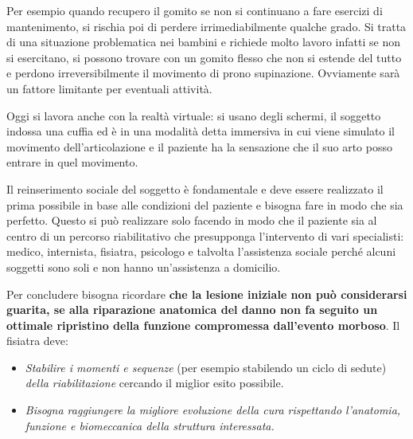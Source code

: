 Per esempio quando recupero il gomito se non si continuano a fare esercizi di mantenimento, si rischia poi di perdere irrimediabilmente qualche grado. Si tratta di una situazione problematica nei bambini e richiede molto lavoro infatti se non si esercitano, si possono trovare
con un gomito flesso che non si estende del tutto e perdono irreversibilmente il movimento di prono supinazione. Ovviamente sarà un fattore limitante per eventuali attività.

Oggi si lavora anche con la realtà virtuale: si usano degli schermi, il soggetto indossa una cuffia ed è in una modalità detta immersiva in cui viene simulato il movimento dell'articolazione e il paziente ha la sensazione che il suo arto posso entrare in quel movimento.

Il reinserimento sociale del soggetto è fondamentale e deve essere realizzato il prima possibile in base alle condizioni del paziente e bisogna fare in modo che sia perfetto. Questo si può realizzare solo facendo in modo che il paziente sia al centro di un percorso riabilitativo che presupponga l'intervento di vari specialisti: medico,
internista, fisiatra, psicologo e talvolta l'assistenza sociale perché alcuni soggetti sono soli e non hanno un'assistenza a domicilio.

Per concludere bisogna ricordare \textbf{che la lesione iniziale non può considerarsi guarita, se alla riparazione anatomica del danno non fa seguito un ottimale ripristino della funzione compromessa dall'evento morboso}. Il fisiatra deve:

\begin{itemize}
\item
  \emph{Stabilire i momenti e sequenze} (per esempio stabilendo un ciclo di sedute) \emph{della riabilitazione} cercando il miglior esito possibile.
\item
  \emph{Bisogna raggiungere la migliore evoluzione della cura rispettando l'anatomia, funzione e biomeccanica della struttura interessata. }
\end{itemize}
